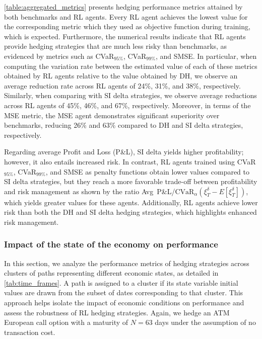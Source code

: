 \documentclass[12pt]{article}
\begin{document}
\autoref{table:aggregated_metrics} presents hedging performance metrics attained by both benchmarks and RL agents. 
Every RL agent achieves the lowest value for the corresponding metric which they used as objective function during training, which is expected.
Furthermore, the numerical results indicate that RL agents provide hedging strategies that are much less risky than benchmarks, as evidenced by metrics such as CVaR$_{95\%}$, CVaR$_{99\%}$, and SMSE. In particular, when computing the variation rate between the estimated value of each of these metrics obtained by RL agents relative to the value obtained by DH, we observe an average reduction rate across RL agents of 24\%, 31\%, and 38\%, respectively. Similarly, when comparing with SI delta strategies, we observe average reductions across RL agents of 45\%, 46\%, and 67\%, respectively. Moreover, in terms of the MSE metric, the MSE agent demonstrates significant superiority over benchmarks, reducing 26\% and 63\% compared to DH and SI delta strategies, respectively. 

Regarding average Profit and Loss (P\&L), SI delta yields higher profitability; however, it also entails increased risk. In contrast, RL agents trained using CVaR$_{95\%}$, CVaR$_{99\%}$, and SMSE as penalty functions obtain lower values compared to SI delta strategies, but they reach a more favorable trade-off between profitability and risk management as shown by the ratio \mbox{Avg P\&L/$\mbox{CVaR}_{\alpha}(\xi_{T}^{\delta} - E[\xi_{T}^{\delta}])$}, which yields greater values for these agents. Additionally, RL agents achieve lower risk than both the DH and SI delta hedging strategies, which highlights enhanced risk management. 

\subsubsection{Impact of the state of the economy on performance}\label{subsub:benchmarking_economy}

In this section, we analyze the performance metrics of hedging strategies across clusters of paths representing different economic states, as detailed in \autoref{tab:time_frames}. A path is assigned to a cluster if its state variable initial values are drawn from the subset of dates corresponding to that cluster. This approach helps isolate the impact of economic conditions on performance and assess the robustness of RL hedging strategies.
Again, we hedge an ATM European call option with a maturity of $N=63$ days under the assumption of no transaction cost.
\end{document}
